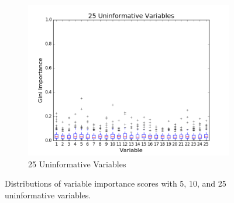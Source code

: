 \begin{figure}[H]
\begin{subfigure}[b]{0.45\textwidth}
    \includegraphics[width=\textwidth]{figures/random_forests/rf_variable_count_bias_25.png}
    \caption{25 Uninformative Variables}
    \label{fig:var-count-25}
  \end{subfigure}
  \caption{Distributions of variable importance scores with 5, 10, and 25 uninformative variables.}
  \label{fig:var-count}
\end{figure}

